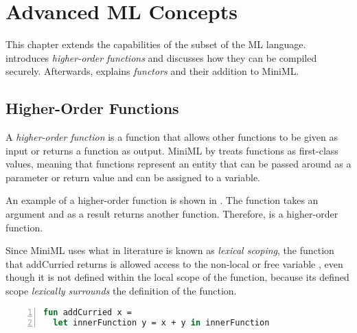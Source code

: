 \chapter{Advanced ML Concepts}

This chapter extends the capabilities of the subset of the ML language.  introduces \emph{higher-order functions} and discusses how they can be compiled securely. Afterwards,  explains \emph{functors} and their addition to MiniML. %

\section{Higher-Order Functions}
\label{sec:HOF}

A \emph{higher-order function} is a function that allows other functions to be given as input or returns a function as output. \mbox{MiniML} by treats functions as first-class values, meaning that functions represent an entity that can be passed around as a parameter or return value and can be assigned to a variable.

\smallskip
An example of a higher-order function is shown in . 
The function  takes an argument  and as a result returns another function.
Therefore,  is a higher-order function.

Since \mbox{MiniML} uses what in literature is known as \emph{lexical scoping}, the function that addCurried returns is allowed access to the non-local or free variable , even though it is not defined within the local scope of the function, because its defined scope \emph{lexically surrounds} the definition of the function.


\begin{lstlisting}[frame=single, language=ML,caption=The use of lexical scoping calls for closures., label=code:LexicalScopingExample,numbers=left]
fun addCurried x = 
  let innerFunction y = x + y in innerFunction
\end{lstlisting}
\label{code:LexicalScopingExample}


